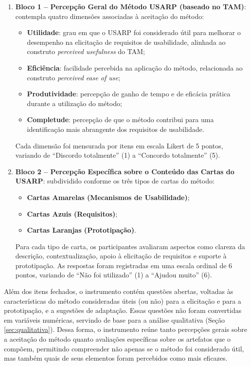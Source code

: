 \begin{enumerate}
    \item \textbf{Bloco 1 -- Percepção Geral do Método USARP (baseado no TAM)}: contempla quatro dimensões associadas à aceitação do método:
    \begin{itemize}[leftmargin=1.5cm,label=\textbullet]
        \item \textbf{Utilidade}: grau em que o USARP foi considerado útil para melhorar o desempenho na elicitação de requisitos de usabilidade, alinhada ao construto \textit{perceived usefulness} do TAM;
        \item \textbf{Eficiência}: facilidade percebida na aplicação do método, relacionada ao construto \textit{perceived ease of use};
        \item \textbf{Produtividade}: percepção de ganho de tempo e de eficácia prática durante a utilização do método;
        \item \textbf{Completude}: percepção de que o método contribui para uma identificação mais abrangente dos requisitos de usabilidade.
    \end{itemize}
    Cada dimensão foi mensurada por itens em escala Likert de 5 pontos, variando de ``Discordo totalmente'' (1) a ``Concordo totalmente'' (5).

    \item \textbf{Bloco 2 -- Percepção Específica sobre o Conteúdo das Cartas do USARP}: subdividido conforme os três tipos de cartas do método:
    \begin{itemize}[leftmargin=1.5cm,label=\textbullet]
        \item \textbf{Cartas Amarelas (Mecanismos de Usabilidade)};
        \item \textbf{Cartas Azuis (Requisitos)};
        \item \textbf{Cartas Laranjas (Prototipação)}.
    \end{itemize}
    Para cada tipo de carta, os participantes avaliaram aspectos como clareza da descrição, contextualização, apoio à elicitação de requisitos e suporte à prototipação. As respostas foram registradas em uma escala ordinal de 6 pontos, variando de ``Não foi utilizado'' (1) a ``Ajudou muito'' (6).
\end{enumerate}

Além dos itens fechados, o instrumento contém questões abertas, voltadas às características do método consideradas úteis (ou não) para a elicitação e para a prototipação, e a sugestões de adaptação. Essas questões não foram convertidas em variáveis numéricas, servindo de base para a análise qualitativa (Seção \ref{sec:qualitativa}). Dessa forma, o instrumento reúne tanto percepções gerais sobre a aceitação do método quanto avaliações específicas sobre os artefatos que o compõem, permitindo compreender não apenas se o método foi considerado útil, mas também quais de seus elementos foram percebidos como mais eficazes.

